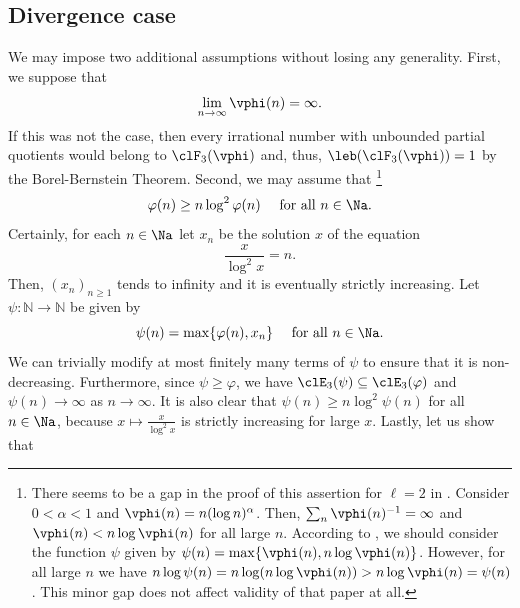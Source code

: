 \documentclass[12pt,a4paper]{amsart}
\begin{document}
\subsection{Divergence case}
We may impose two additional assumptions without losing any generality. First, we suppose that 
\[
\lim_{n\to\infty} \vphi(n)=\infty.
\]
If this was not the case, then every irrational number with unbounded partial quotients would belong to $\clF_{3}(\vphi)$ and, thus, $\leb(\clF_{3}(\vphi))=1$ by the Borel-Bernstein Theorem. 
Second, we may assume that \footnote{There seems to be a gap in the proof of this assertion for $\ell=2$ in \cite{TanZhou2024}. Consider $0<\alpha<1$ and $\vphi(n)=n(\log n)^{\alpha}$. Then, $\sum_n \vphi(n)^{-1}=\infty$ and $\vphi(n)< n\log \vphi(n)$ for all large $n$. According to \cite[Section 3.2]{TanZhou2024}, we should consider the function $\psi$ given by $\psi(n)=\max\{\vphi(n), n\log\vphi(n)\}$. However, for all large $n$ we have $n\log \psi(n) = n\log (n\log \vphi(n)) > n\log \vphi(n) = \psi(n)$. This minor gap does not affect validity of that paper at all.} 
\begin{equation}\label{Eq:WLOG}
\varphi(n) \geq n \log^{2}\varphi(n)
\quad
\text{ for all }n\in \Na.
\end{equation}
Certainly, for each $n\in\Na$ let $x_n$ be the solution $x$ of the equation
\[
    \frac{x}{\log^{2}x} = n. 
\]
Then, $(x_n)_{n\geq 1}$ tends to infinity and it is eventually strictly increasing. Let $\psi: \mathbb{N} \to \mathbb{N}$ be given by 
\[
    \psi(n) = \max\{\varphi(n),x_n\}
    \quad
    \text{ for all }n\in\Na.
\]
We can trivially modify at most finitely many terms of $\psi$ to ensure that it is non-decreasing. Furthermore, since $\psi \geq \varphi$, we have $\clE_{3}(\psi) \subseteq \clE_{3}(\varphi)$ and $\psi(n) \to \infty$ as $n\to\infty$. 
It is also clear that $\psi(n) \geq n\log^{2} \psi(n)$ for all $n\in\Na$, because $x \mapsto \frac{x}{\log^{2}x}$ is strictly increasing for large $x$. Lastly, let us show that
\end{document}
